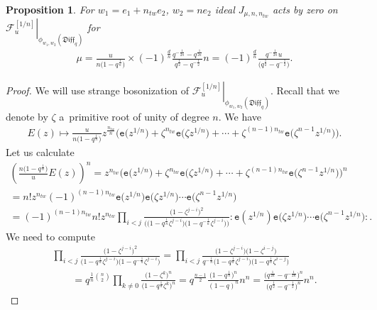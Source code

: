 \documentclass[pdftex]{sigma}
\numberwithin{equation}{section}
\newtheorem{Proposition}[Theorem]{Proposition}
\theoremstyle{definition}
\newcommand{\half}{\frac{1}{2}}
\newcommand{\qD}{\mathfrak{Diff}_q}
\newcommand{\se}{\mathtt{e}}
\begin{document}
\begin{Proposition} \label{prop: mu for restriction}
For $w_1 = e_1+n_{tw}e_2$, $w_2 = ne_2$ ideal $J_{\mu, n, n_{tw}}$ acts by zero on $\left. \mathcal{F}^{[1/n]}_{u} \right|_{\phi_{w_1,w_2}(\qD)}$ for
\begin{gather} \label{eq:prop: mu for restriction}
\mu = \frac{u}{n\big(1-q^{\frac1n}\big)} \times (-1)^{\frac{d}{n}} \frac{q^{-\frac{1}{2n}}-q^{\frac{1}{2n}}}{q^{\half}-q^{-\half}} n = (-1)^{\frac{d}{n}} \frac{q^{-\frac{1}{2n}} u}{\big(q^{\half}-q^{-\half}\big)}.
\end{gather}
\end{Proposition}
\begin{proof}
We will use strange bosonization of $\left. \mathcal{F}^{[1/n]}_{u} \right|_{\phi_{w_1,w_2}(\qD)}$. Recall that we denote by $\zeta$ a~primitive root of unity of degree $n$. We have
\begin{gather*}
E(z) \mapsto \frac{u}{n\big(1-q^{\frac1n}\big)} z^{\frac{n_{tw}}{n}} \big(\se\big(z^{1/n}\big)+\zeta^{n_{tw}} \se\big(\zeta z^{1/n}\big) + \cdots + \zeta^{(n-1)n_{tw}} \se\big(\zeta^{n-1}z^{1/n}\big) \big).
\end{gather*}
Let us calculate
\begin{gather*}
 \left( \frac{n\big(1-q^{\frac1n}\big)}{u} E(z)\right)^n = z^{n_{tw}}\big( \se\big(z^{1/n}\big)+\zeta^{n_{tw}} \se\big(\zeta z^{1/n}\big) + \cdots + \zeta^{(n-1)n_{tw}} \se\big(\zeta^{n-1}z^{1/n}\big)\big)^n \\
{} = n! z^{n_{tw}} (-1)^{(n-1)n_{tw}} \se\big(z^{1/n}\big) \se\big(\zeta z^{1/n}\big) \cdots \se\big(\zeta^{n-1} z^{1/n}\big) \\
{} = (-1)^{(n-1)n_{tw}}
n! z^{n_{tw}} \prod_{i<j} \frac{\big( 1 - \zeta^{j-i} \big)^2}{\big(\big( 1- q^{\frac{1}{n}}\zeta^{j-i} \big)\big(1 - q^{-\frac{1}{n}} \zeta^{j-i}\big)\big)} {:\!\se(z^{1/n}) \se\big(\zeta z^{1/n}\big) \cdots \se\big(\zeta^{n-1} z^{1/n}\big)\!:}.
\end{gather*}
We need to compute
\begin{gather*}
\prod_{i<j} \frac{\big( 1 - \zeta^{j-i} \big)^2}{ \big( 1- q^{\frac{1}{n}}\zeta^{j-i} \big)\big(1 - q^{-\frac{1}{n}} \zeta^{j-i} \big)} = \prod_{i < j} \frac{\big(1-\zeta^{j-i}\big)\big(1-\zeta^{i-j}\big)}{q^{-\frac{1}{n}}\big(1-q^{\frac{1}{n}}\zeta^{j-i}\big) \big(1-q^{\frac{1}{n}}\zeta^{i-j}\big)}\\
\qquad{} = q^{\frac{1}{n} \binom{n}{2}}\prod_{k\neq 0} \frac{\big( 1 - \zeta^{k} \big)^{n}}{\big( 1- q^{\frac{1}{n}}\zeta^{k} \big)^{n} } = q^{\frac{n-1}{2}} \frac{\big(1-q^{\frac{1}{n}}\big)^n }{(1-q)^n } n^{n} = \frac{\big(q^{\frac{1}{2n}}-q^{-\frac{1}{2n}}\big)^n}{\big(q^{\half}-q^{-\half}\big)^n} n^n.

\end{gather*}
\end{proof}
\end{document}
